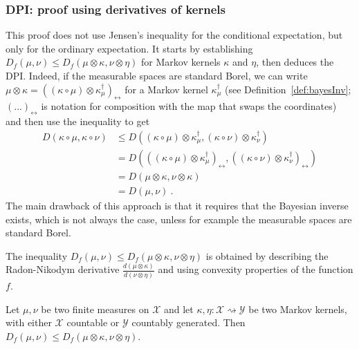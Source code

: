 \subsubsection{DPI: proof using derivatives of kernels}

This proof does not use Jensen's inequality for the conditional expectation, but only for the ordinary expectation. 
It starts by establishing $D_f(\mu, \nu) \le D_f(\mu \otimes \kappa, \nu \otimes \eta)$ for Markov kernels $\kappa$ and $\eta$, then deduces the DPI.
Indeed, if the measurable spaces are standard Borel, we can write $\mu \otimes \kappa = ((\kappa \circ \mu) \otimes \kappa^\dagger_\mu)_\leftrightarrow$ for a Markov kernel $\kappa^\dagger_\mu$ (see Definition~\ref{def:bayesInv}; $(...)_\leftrightarrow$ is notation for composition with the map that swaps the coordinates) and then use the inequality to get
\begin{align*}
D(\kappa \circ \mu, \kappa \circ \nu)
&\le D((\kappa \circ \mu) \otimes \kappa^\dagger_\mu, (\kappa \circ \nu) \otimes \kappa^\dagger_\nu)
\\
&= D(((\kappa \circ \mu) \otimes \kappa^\dagger_\mu)_{\leftrightarrow}, ((\kappa \circ \nu) \otimes \kappa^\dagger_\nu)_{\leftrightarrow})
\\
&= D(\mu \otimes \kappa, \nu \otimes \kappa)
\\
&= D(\mu, \nu)
\: .
\end{align*}
The main drawback of this approach is that it requires that the Bayesian inverse exists, which is not always the case, unless for example the measurable spaces are standard Borel.

The inequality $D_f(\mu, \nu) \le D_f(\mu \otimes \kappa, \nu \otimes \eta)$ is obtained by describing the Radon-Nikodym derivative $\frac{d(\mu \otimes \kappa)}{d(\nu \otimes \eta)}$ and using convexity properties of the function $f$.

\begin{theorem}
  \label{thm:fDiv_le_compProd_1}
  \leanok
  Let $\mu, \nu$ be two finite measures on $\mathcal X$ and let $\kappa, \eta : \mathcal X \rightsquigarrow \mathcal Y$ be two Markov kernels, with either $\mathcal X$ countable or $\mathcal{Y}$ countably generated.
  Then $D_f(\mu, \nu) \le D_f(\mu \otimes \kappa, \nu \otimes \eta)$.
\end{theorem}

